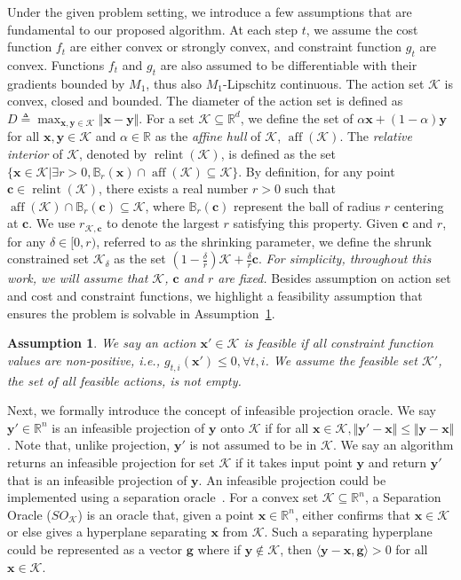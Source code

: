 \documentclass[twoside,11pt,]{article}
\newtheorem{assumption}{Assumption}
\newcommand{\op}[1]{\operatorname{#1}}
\newcommand{\C}[1]{\mathcal{#1}}
\newcommand{\BF}[1]{\mathbf{#1}}
\newcommand{\BB}[1]{\mathbb{#1}}
\newcommand{\K}{\C{K}}
\newcommand{\x}{\BF{x}}
\newcommand{\y}{\BF{y}}
\newcommand{\g}{\BF{g}}
\renewcommand{\cite}[1]{\citep{#1}}
\begin{document}
Under the given problem setting, we introduce a few assumptions that are fundamental to our proposed algorithm.
At each step $t$, we assume the cost function $f_t$ are either convex or strongly convex, and constraint function $g_t$ are convex.
Functions $f_t$ and $g_t$ are also assumed to be differentiable with their gradients bounded by $M_1$, thus also $M_1$-Lipschitz continuous.
The action set $\K$ is convex, closed and bounded. 
The diameter of the action set is defined as $D \triangleq \max_{\x,\y\in \K}\Vert \x-\y \Vert$.
For a set $\K \subseteq \BB{R}^d$, we define the set of $\alpha\x+(1-\alpha)\y$ for all $\x,\y\in\K$ and $\alpha\in\BB{R}$ as the \textit{affine hull} of $\K$, $\op{aff}(\K)$.
The \textit{relative interior} of $\K$, denoted by $\op{relint}(\K)$, is defined as the set $\{\x\in\K | \exists r > 0, \BB{B}_r(\x) \cap \op{aff}(\K) \subseteq \K \}$.
By definition, for any point $\BF{c} \in \op{relint}(\K)$, there exists a real number $r > 0$ such that $\op{aff}(\K)\cap \BB{B}_r(\BF{c}) \subseteq \K$, where $\BB{B}_r(\BF{c})$ represent the ball of radius $r$ centering at $\BF{c}$.
We use $r_{\K, \BF{c}}$ to denote the largest $r$ satisfying this property.
Given $\BF{c}$ and $r$, for any $\delta \in [0,r)$, referred to as the shrinking parameter, we define the shrunk constrained set $\K_\delta$ as the set $(1-\frac{\delta}{r})\K + \frac{\delta}{r}\BF{c}$.
\emph{For simplicity, throughout this work, we will assume that $\K$, $\BF{c}$ and $r$ are fixed.}
Besides assumption on action set and cost and constraint functions, we highlight a feasibility assumption that ensures the problem is solvable in Assumption~\ref{asm:feas}.
\begin{assumption}
\label{asm:feas}
    We say an action $\x' \in \K$ is feasible if all constraint function values are non-positive, i.e., $g_{t,i}(\x') \leq 0, \forall t,i$.
    We assume the feasible set $\K'$, the set of all feasible actions, is not empty.
\end{assumption}


Next, we formally introduce the concept of infeasible projection oracle.
We say $\y' \in \BB{R}^n$ is an infeasible projection of $\y$ onto $\K$ if for all $\x \in \K, \Vert \y'-\x \Vert \leq \Vert \y-\x \Vert$.
Note that, unlike projection, $\y'$ is not assumed to be in $\K$.
We say an algorithm returns an infeasible projection for set $\K$ if it takes input point $\y$ and return $\y'$ that is an infeasible projection of $\y$.
An infeasible projection could be implemented using a separation oracle~\cite{garber2022new}.
For a convex set $\K \subseteq \BB{R}^n$, a Separation Oracle ($SO_\K$) is an oracle that, given a point $\x \in \BB{R}^n$, either confirms that $\x \in \K$ or else gives a hyperplane separating $\x$ from $\K$.
Such a separating hyperplane could be represented as a vector $\g$ where if $\y \notin \K$, then $\langle \y - \x, \g \rangle > 0$ for all $\x \in \C{K}$.
\end{document}
